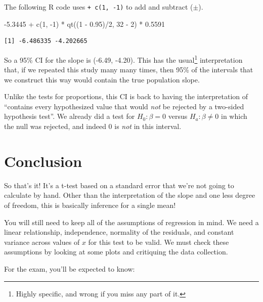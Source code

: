 \documentclass[
  letterpaper,
  DIV=11,
  numbers=noendperiod,
  oneside]{scrreprt}
\newenvironment{Shaded}{\begin{snugshade}}{\end{snugshade}}
\newcommand{\DecValTok}[1]{\textcolor[rgb]{0.68,0.00,0.00}{#1}}
\newcommand{\FloatTok}[1]{\textcolor[rgb]{0.68,0.00,0.00}{#1}}
\newcommand{\FunctionTok}[1]{\textcolor[rgb]{0.28,0.35,0.67}{#1}}
\newcommand{\NormalTok}[1]{\textcolor[rgb]{0.00,0.23,0.31}{#1}}
\newcommand{\SpecialCharTok}[1]{\textcolor[rgb]{0.37,0.37,0.37}{#1}}
\begin{document}
The following R code uses \texttt{+\ c(1,\ -1)} to add and subtract
(\(\pm\)).

\begin{Shaded}
\begin{Highlighting}[]
\SpecialCharTok{{-}}\FloatTok{5.3445} \SpecialCharTok{+} \FunctionTok{c}\NormalTok{(}\DecValTok{1}\NormalTok{, }\SpecialCharTok{{-}}\DecValTok{1}\NormalTok{) }\SpecialCharTok{*} \FunctionTok{qt}\NormalTok{((}\DecValTok{1} \SpecialCharTok{{-}} \FloatTok{0.95}\NormalTok{)}\SpecialCharTok{/}\DecValTok{2}\NormalTok{, }\DecValTok{32} \SpecialCharTok{{-}} \DecValTok{2}\NormalTok{) }\SpecialCharTok{*} \FloatTok{0.5591}
\end{Highlighting}
\end{Shaded}

\begin{verbatim}
[1] -6.486335 -4.202665
\end{verbatim}

So a 95\% CI for the slope is (-6.49, -4.20). This has the
usual\footnote{Highly specific, and wrong if you miss any part of it.}
interpretation that, if we repeated this study many many times, then
95\% of the intervals that we construct this way would contain the true
population slope.

Unlike the tests for proportions, this CI is back to having the
interpretation of ``contains every hypothesized value that would
\emph{not} be rejected by a two-sided hypothesis test''. We already did
a test for \(H_0:\beta = 0\) versus \(H_a:\beta \ne 0\) in which the
null was rejected, and indeed 0 is \emph{not} in this interval.

\hypertarget{conclusion-2}{%
\section{Conclusion}\label{conclusion-2}}

So that's it! It's a t-test based on a standard error that we're not
going to calculate by hand. Other than the interpretation of the slope
and one less degree of freedom, this is basically inference for a single
mean!

You will still need to keep all of the assumptions of regression in
mind. We need a linear relationship, independence, normality of the
residuals, and constant variance across values of \(x\) for this test to
be valid. We must check these assumptions by looking at some plots and
critiquing the data collection.

For the exam, you'll be expected to know:
\end{document}
